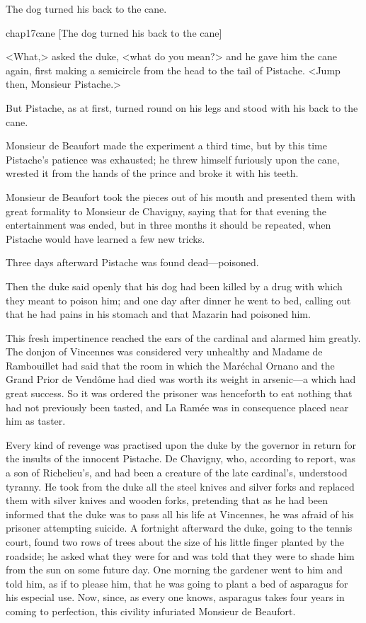 The dog turned his back to the cane.

\begin{bwbigpic}
	[\basicscale] 
	{chap17cane}
	[The dog turned his back to the cane]
\end{bwbigpic}

<What,> asked the duke, <what do you mean?> and he gave him the cane again, first making a semicircle from the head to the tail of Pistache. <Jump then, Monsieur Pistache.>

But Pistache, as at first, turned round on his legs and stood with his back to the cane.

Monsieur de Beaufort made the experiment a third time, but by this time Pistache's patience was exhausted; he threw himself furiously upon the cane, wrested it from the hands of the prince and broke it with his teeth.

Monsieur de Beaufort took the pieces out of his mouth and presented them with great formality to Monsieur de Chavigny, saying that for that evening the entertainment was ended, but in three months it should be repeated, when Pistache would have learned a few new tricks.

Three days afterward Pistache was found dead—poisoned.

Then the duke said openly that his dog had been killed by a drug with which they meant to poison him; and one day after dinner he went to bed, calling out that he had pains in his stomach and that Mazarin had poisoned him.

This fresh impertinence reached the ears of the cardinal and alarmed him greatly. The donjon of Vincennes was considered very unhealthy and Madame de Rambouillet had said that the room in which the Maréchal Ornano and the Grand Prior de Vendôme had died was worth its weight in arsenic—a  which had great success. So it was ordered the prisoner was henceforth to eat nothing that had not previously been tasted, and La Ramée was in consequence placed near him as taster.

Every kind of revenge was practised upon the duke by the governor in return for the insults of the innocent Pistache. De Chavigny, who, according to report, was a son of Richelieu's, and had been a creature of the late cardinal's, understood tyranny. He took from the duke all the steel knives and silver forks and replaced them with silver knives and wooden forks, pretending that as he had been informed that the duke was to pass all his life at Vincennes, he was afraid of his prisoner attempting suicide. A fortnight afterward the duke, going to the tennis court, found two rows of trees about the size of his little finger planted by the roadside; he asked what they were for and was told that they were to shade him from the sun on some future day. One morning the gardener went to him and told him, as if to please him, that he was going to plant a bed of asparagus for his especial use. Now, since, as every one knows, asparagus takes four years in coming to perfection, this civility infuriated Monsieur de Beaufort.

